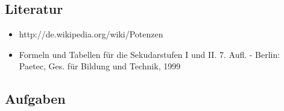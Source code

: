 \subsection{Literatur}
\begin{itemize}
	\item http://de.wikipedia.org/wiki/Potenzen
	\item Formeln und Tabellen für die Sekudarstufen I und II. 7. Aufl. - Berlin: Paetec, Ges. für Bildung und Technik, 1999
\end{itemize}
\pagebreak
\subsection{Aufgaben}

